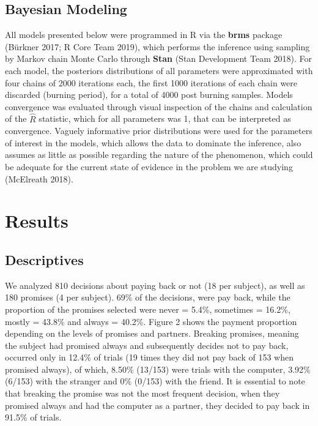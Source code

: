 \documentclass[smallextended]{svjour3}       %
\begin{document}
\hypertarget{bayesian-modeling}{%
\subsection{Bayesian Modeling}\label{bayesian-modeling}}

All models presented below were programmed in R via the \textbf{brms}
package (Bürkner 2017; R Core Team 2019), which performs the inference
using sampling by Markov chain Monte Carlo through \textbf{Stan} (Stan
Development Team 2018). For each model, the posteriors distributions of
all parameters were approximated with four chains of 2000 iterations
each, the first 1000 iterations of each chain were discarded (burning
period), for a total of 4000 post burning samples. Models convergence
was evaluated through visual inspection of the chains and calculation of
the \(\hat{R}\) statistic, which for all parameters was 1, that can be
interpreted as convergence. Vaguely informative prior distributions were
used for the parameters of interest in the models, which allows the data
to dominate the inference, also assumes as little as possible regarding
the nature of the phenomenon, which could be adequate for the current
state of evidence in the problem we are studying (McElreath 2018).

\hypertarget{results}{%
\section{Results}\label{results}}

\hypertarget{descriptives}{%
\subsection{Descriptives}\label{descriptives}}

We analyzed 810 decisions about paying back or not (18 per subject), as
well as 180 promises (4 per subject). 69\% of the decisions, were pay
back, while the proportion of the promises selected were never = 5.4\%,
sometimes = 16.2\%, mostly = 43.8\% and always = 40.2\%. Figure 2 shows
the payment proportion depending on the levels of promises and partners.
Breaking promises, meaning the subject had promised always and
subsequently decides not to pay back, occurred only in 12.4\% of trials
(19 times they did not pay back of 153 when promised always), of which,
8.50\% (13/153) were trials with the computer, 3.92\% (6/153) with the
stranger and 0\% (0/153) with the friend. It is essential to note that
breaking the promise was not the most frequent decision, when they
promised always and had the computer as a partner, they decided to pay
back in 91.5\% of trials.
\end{document}

